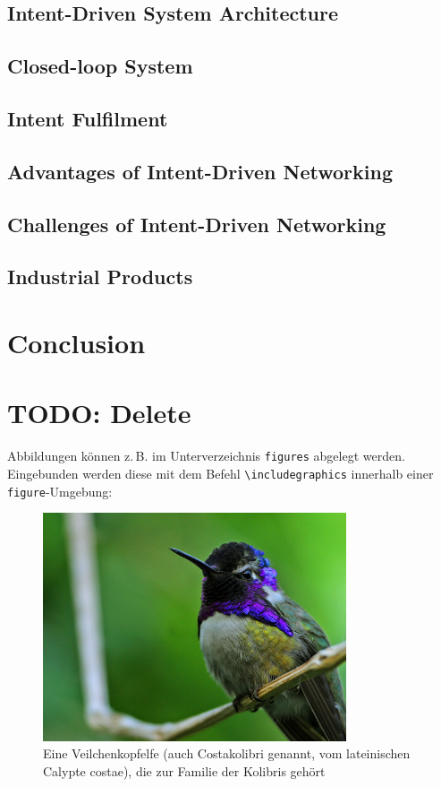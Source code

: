 \subsection{Intent-Driven System Architecture}

\subsection{Closed-loop System}

\subsection{Intent Fulfilment}

\subsection{Advantages of Intent-Driven Networking}

\subsection{Challenges of Intent-Driven Networking}

\subsection{Industrial Products}

\section{Conclusion}
\label{sec:Conclusion}





\section{TODO: Delete}
\label{sec:Delete}
Abbildungen können z.\,B. im Unterverzeichnis \texttt{figures} abgelegt werden.
Eingebunden werden diese mit dem Befehl \texttt{\textbackslash includegraphics} innerhalb
einer \texttt{figure}-Umgebung:
\begin{figure}[htb]
  \centering
  \includegraphics[width=0.8\textwidth]{figures/Hummingbird.jpg}
  \caption{Eine Veilchenkopfelfe (auch Costakolibri genannt, vom lateinischen Calypte costae), die zur Familie der Kolibris gehört \cite{Kolibri}}
  \label{fig:kolibri}
\end{figure}

